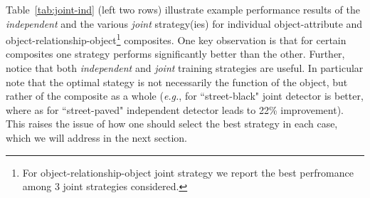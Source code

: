 \documentclass[runningheads]{llncs}
\makeatletter
\newcommand*{\eg}{{\em e.g.}\@\xspace}
\makeatother
\begin{document}
\vspace{-0.05in}




Table~\ref{tab:joint-ind} (left two rows) illustrate example performance results of the {\em independent} and the various {\em joint} strategy(ies) for individual object-attribute and object-relationship-object\footnote{For object-relationship-object joint strategy we report the best perfromance among $3$ joint strategies considered.} composites. One key observation is that for certain composites one strategy performs significantly better than the other.
Further, notice that both {\em independent} and {\em joint} training strategies are useful. In particular note that the optimal stategy is not necessarily the function of the object, but rather of the composite as a whole (\eg, for ``street-black" joint detector is better, where as for ``street-paved" independent detector leads to 22\% improvement). This raises the issue of how one should select the best strategy in each case, which we will address in the next section.  
\end{document}
